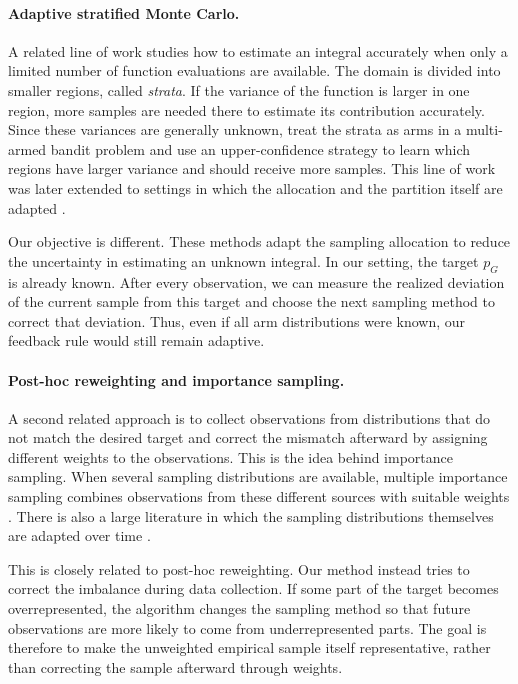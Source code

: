 \documentclass[twoside]{article}
\begin{document}
\paragraph{Adaptive stratified Monte Carlo.}
A related line of work studies how to estimate an integral accurately when only
a limited number of function evaluations are available. The domain is divided
into smaller regions, called \emph{strata}. If the variance of the function is
larger in one region, more samples are needed there to estimate its contribution
accurately. Since these variances are generally unknown, 
\cite{carpentier2011finite} treat the strata as arms in a multi-armed bandit
problem and use an upper-confidence strategy to learn which regions have larger
variance and should receive more samples. This line of work was later extended
to settings in which the allocation and the partition itself are adapted
\citep{carpentier2012adaptive,carpentier2013toward,carpentier2015adaptive}.

Our objective is different. These methods adapt the sampling allocation to
reduce the uncertainty in estimating an unknown integral. In our setting, the
target \(p_G\) is already known. After every observation, we can measure the
realized deviation of the current sample from this target and choose the next
sampling method to correct that deviation. Thus, even if all arm distributions
were known, our feedback rule would still remain adaptive.

\paragraph{Post-hoc reweighting and importance sampling.}
A second related approach is to collect observations from distributions that do
not match the desired target and correct the mismatch afterward by assigning
different weights to the observations. This is the idea behind importance
sampling. When several sampling distributions are available, multiple
importance sampling combines observations from these different sources with
suitable weights \citep{elvira2019generalized}. There is also a large literature
in which the sampling distributions themselves are adapted over time
\citep{bugallo2017adaptive,elvira2021advances,lu2023daisee}.

This is closely related to post-hoc reweighting. Our method instead tries to correct the imbalance during data
collection. If some part of the target becomes overrepresented, the algorithm
changes the sampling method so that future observations are more likely to come
from underrepresented parts. The goal is therefore to make the unweighted
empirical sample itself representative, rather than correcting the sample
afterward through weights.
\end{document}
